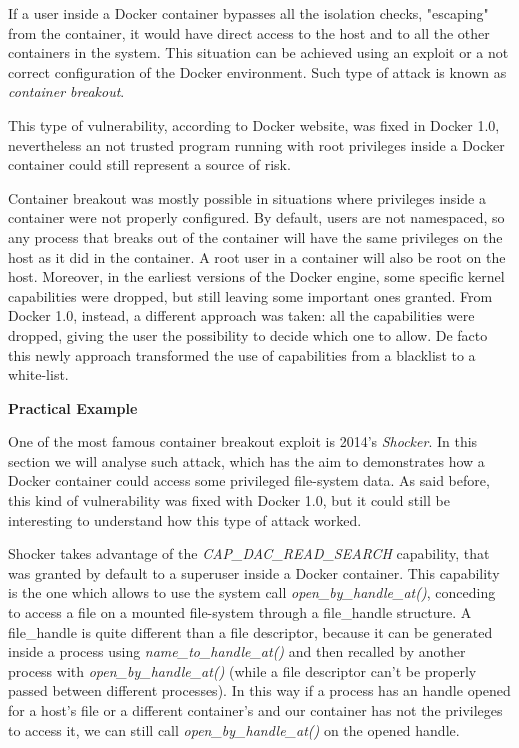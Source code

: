\documentclass[a4paper,12pt]{article}
\begin{document}
If a user inside a Docker container bypasses all the isolation checks,
"escaping" from the container, it would have direct access to the host and to
all the other containers in the system. This situation can be achieved using an
exploit or a not correct configuration of the Docker environment. Such type of
attack is known as \textit{container breakout}.\par This type of vulnerability,
according to Docker website\cite{docker_blog_about_container_breakout}, was
fixed in Docker 1.0, nevertheless an not trusted program running with root
privileges inside a Docker container could still represent a source of risk.
\par Container breakout was mostly possible in situations where privileges
inside a container were not properly configured. By default, users are not
namespaced, so any process that breaks out of the container will have the same
privileges on the host as it did in the container. A root user in a container
will also be root on the host. Moreover, in the earliest versions of the Docker
engine, some specific kernel capabilities were dropped, but still leaving some
important ones granted. From Docker 1.0, instead, a different approach was
taken: all the capabilities were dropped, giving the user the possibility to
decide which one to allow. De facto this newly approach transformed the use of
capabilities from a blacklist to a white-list.

\bigbreak\textbf{Practical Example}\bigbreak 

One of the most famous container breakout exploit is 2014's
\textit{Shocker}\cite{shocker}. In this section we will analyse such attack,
which has the aim to demonstrates how a Docker container could access some
privileged file-system data. As said before, this kind of vulnerability was
fixed with Docker 1.0, but it could still be interesting to understand how this
type of attack worked\cite{shocker_how_it_works}.\par Shocker takes advantage of
the \textit{CAP\_DAC\_READ\_SEARCH} capability, that was granted by default to a
superuser inside a Docker container. This capability is the one which allows to
use the system call \textit{open\_by\_handle\_at()}, conceding to access a file
on a mounted file-system through a file\_handle structure. A file\_handle is
quite different than a file descriptor, because it can be generated inside a
process using \textit{name\_to\_handle\_at()} and then recalled by another
process with \textit{open\_by\_handle\_at()} (while a file descriptor can't be
properly passed between different processes). In this way if a process has an
handle opened for a host's file or a different container's and our container has
not the privileges to access it, we can still call
\textit{open\_by\_handle\_at()} on the opened handle.
\end{document}
